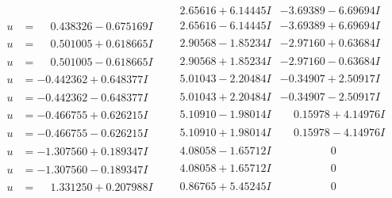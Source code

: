 \documentclass[1p]{elsarticle_modified}
\theoremstyle{definition}
\begin{document}
$$\begin{array}{c|c|c}
 & \phantom{-}2.65616 + 6.14445 I & -3.69389 - 6.69694 I \\ \hline\begin{aligned}
u &= \phantom{-}0.438326 - 0.675169 I\end{aligned}
 & \phantom{-}2.65616 - 6.14445 I & -3.69389 + 6.69694 I \\ \hline\begin{aligned}
u &= \phantom{-}0.501005 + 0.618665 I\end{aligned}
 & \phantom{-}2.90568 - 1.85234 I & -2.97160 + 0.63684 I \\ \hline\begin{aligned}
u &= \phantom{-}0.501005 - 0.618665 I\end{aligned}
 & \phantom{-}2.90568 + 1.85234 I & -2.97160 - 0.63684 I \\ \hline\begin{aligned}
u &= -0.442362 + 0.648377 I\end{aligned}
 & \phantom{-}5.01043 - 2.20484 I & -0.34907 + 2.50917 I \\ \hline\begin{aligned}
u &= -0.442362 - 0.648377 I\end{aligned}
 & \phantom{-}5.01043 + 2.20484 I & -0.34907 - 2.50917 I \\ \hline\begin{aligned}
u &= -0.466755 + 0.626215 I\end{aligned}
 & \phantom{-}5.10910 - 1.98014 I & \phantom{-}0.15978 + 4.14976 I \\ \hline\begin{aligned}
u &= -0.466755 - 0.626215 I\end{aligned}
 & \phantom{-}5.10910 + 1.98014 I & \phantom{-}0.15978 - 4.14976 I \\ \hline\begin{aligned}
u &= -1.307560 + 0.189347 I\end{aligned}
 & \phantom{-}4.08058 - 1.65712 I & \phantom{-0.000000 } 0 \\ \hline\begin{aligned}
u &= -1.307560 - 0.189347 I\end{aligned}
 & \phantom{-}4.08058 + 1.65712 I & \phantom{-0.000000 } 0 \\ \hline\begin{aligned}
u &= \phantom{-}1.331250 + 0.207988 I\end{aligned}
 & \phantom{-}0.86765 + 5.45245 I & \phantom{-0.000000 } 0 \\ \hline\begin{aligned}

\end{aligned}
\end{array}$$
\end{document}
